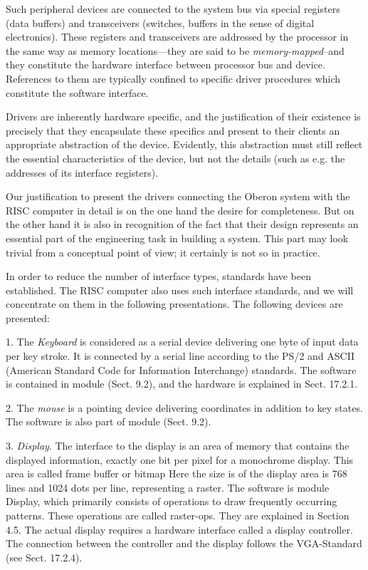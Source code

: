 Such peripheral devices are connected to the system bus via special registers (data buffers) and transceivers (switches, buffers in the sense of digital electronics). These registers and transceivers are addressed by the processor in the same way as memory locations---they are said to be \emph{memory-mapped}--and they constitute the hardware interface between processor bus and device. References to them are typically confined to specific driver procedures which constitute the software interface.

Drivers are inherently hardware specific, and the justification of their existence is precisely that they encapsulate these specifics and present to their clients an appropriate abstraction of the device. Evidently, this abstraction must still reflect the essential characteristics of the device, but not the details (such as e.g. the addresses of its interface registers).

Our justification to present the drivers connecting the Oberon system with the RISC computer in detail is on the one hand the desire for completeness. But on the other hand it is also in recognition of the fact that their design represents an essential part of the engineering task in building a system. This part may look trivial from a conceptual point of view; it certainly is not so in practice.

In order to reduce the number of interface types, standards have been established. The RISC computer also uses such interface standards, and we will concentrate on them in the following presentations. The following devices are presented:

1. The \emph{Keyboard} is considered as a serial device delivering one byte of input data per key stroke. It is connected by a serial line according to the PS/2 and ASCII (American Standard Code for Information Interchange) standards. The software is contained in module  (Sect. 9.2), and the hardware is explained in Sect. 17.2.1.

2. The \emph{mouse} is a pointing device delivering coordinates in addition to key states. The software is also part of module  (Sect. 9.2).

3. \emph{Display}. The interface to the display is an area of memory that contains the displayed information, exactly one bit per pixel for a monochrome display. This area is called frame buffer or bitmap Here the size is of the display area is 768 lines and 1024 dots per line, representing a raster. The software is module Display, which primarily consists of operations to draw frequently occurring patterns. These operations are called raster-ops. They are explained in Section 4.5. The actual display requires a hardware interface called a display controller. The connection between the controller and the display follows the VGA-Standard (see Sect. 17.2.4).

